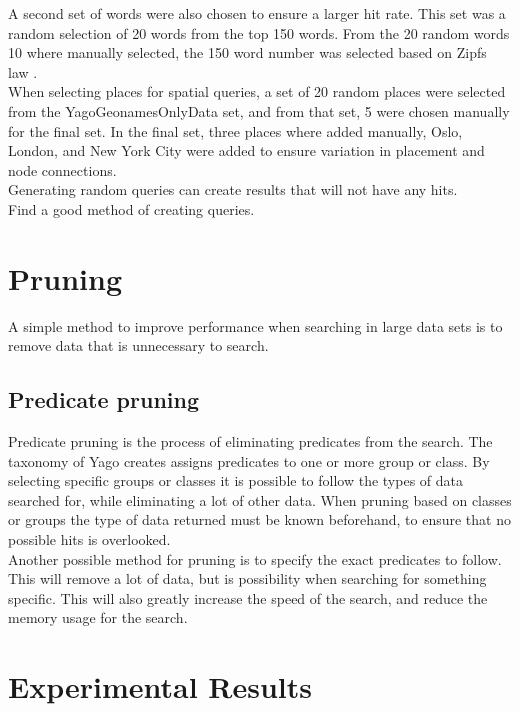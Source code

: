 A second set of words were also chosen to ensure a larger hit rate. This set was a random selection of 20 words from the top 150 words. From the 20 random words 10 where manually selected, the 150 word number was selected based on Zipfs law \cite{zipf}.\\

When selecting places for spatial queries, a set of 20 random places were selected from the YagoGeonamesOnlyData set, and from that set, 5 were chosen manually for the final set. In the final set, three places where added manually, Oslo, London, and New York City were added to ensure variation in placement and node connections.\\

Generating random queries can create results that will not have any hits.\\
Find a good method of creating queries.\\

\section{Pruning}
A simple method to improve performance when searching in large data sets is to remove data that is unnecessary to search.

\subsection{Predicate pruning}
Predicate pruning is the process of eliminating predicates from the search. The taxonomy of Yago creates assigns predicates to one or more group or class. By selecting specific groups or classes it is possible to follow the types of data searched for, while eliminating a lot of other data. When pruning based on classes or groups the type of data returned must be known beforehand, to ensure that no possible hits is overlooked.\\

Another possible method for pruning is to specify the exact predicates to follow. This will remove a lot of data, but is possibility when searching for something specific. This will also greatly increase the speed of the search, and reduce the memory usage for the search. 


\section{Experimental Results}
\label{sec:experimentalResults}

